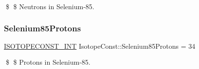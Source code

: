 \$ \$ Neutrons in Selenium-\/85. \mbox{\label{group___isotope_const-_selenium-_se85_gac154c6d2995bb151304aa070e0e0948d}} 
\subsubsection{\texorpdfstring{Selenium85\+Protons}{Selenium85Protons}}
{\footnotesize\ttfamily \mbox{\hyperlink{group___isotope_const-_macros_ga5f18360b3e99483a35c32d789e62621c}{I\+S\+O\+T\+O\+P\+E\+C\+O\+N\+S\+T\+\_\+\+I\+NT}} Isotope\+Const\+::\+Selenium85\+Protons = 34}

\$ \$ Protons in Selenium-\/85. 